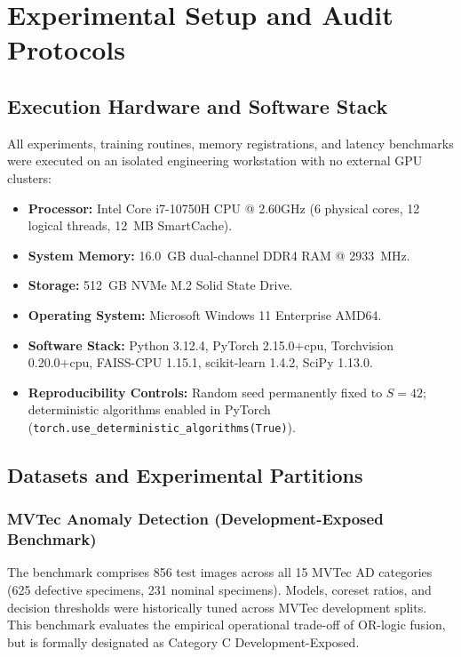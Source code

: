 \documentclass[journal]{IEEEtran}
\begin{document}
\section{Experimental Setup and Audit Protocols}

\subsection{Execution Hardware and Software Stack}
All experiments, training routines, memory registrations, and latency benchmarks were executed on an isolated engineering workstation with no external GPU clusters:
\begin{itemize}
    \item \textbf{Processor:} Intel Core i7-10750H CPU @ 2.60GHz (6 physical cores, 12 logical threads, 12~MB SmartCache).
    \item \textbf{System Memory:} 16.0~GB dual-channel DDR4 RAM @ 2933~MHz.
    \item \textbf{Storage:} 512~GB NVMe M.2 Solid State Drive.
    \item \textbf{Operating System:} Microsoft Windows 11 Enterprise AMD64.
    \item \textbf{Software Stack:} Python 3.12.4, PyTorch 2.15.0+cpu, Torchvision 0.20.0+cpu, FAISS-CPU 1.15.1, scikit-learn 1.4.2, SciPy 1.13.0.
    \item \textbf{Reproducibility Controls:} Random seed permanently fixed to $S = 42$; deterministic algorithms enabled in PyTorch (\texttt{torch.use\_deterministic\_algorithms(True)}).
\end{itemize}

\subsection{Datasets and Experimental Partitions}

\subsubsection{MVTec Anomaly Detection (Development-Exposed Benchmark)}
The benchmark comprises 856 test images across all 15 MVTec AD categories (625 defective specimens, 231 nominal specimens). Models, coreset ratios, and decision thresholds were historically tuned across MVTec development splits. This benchmark evaluates the empirical operational trade-off of OR-logic fusion, but is formally designated as Category C Development-Exposed.
\end{document}
